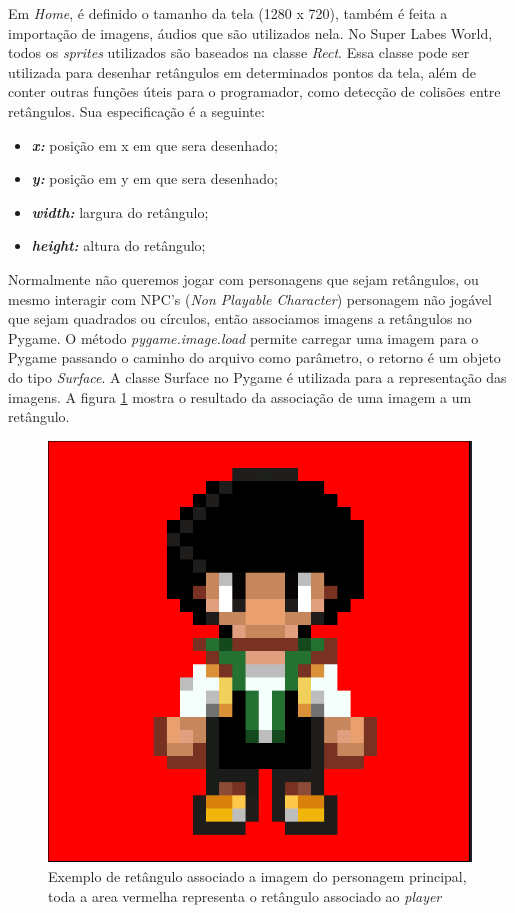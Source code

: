 Em \textit{Home}, é definido o tamanho da tela (1280 x 720), também é feita a importação de imagens, áudios que são utilizados nela.
No Super Labes World, todos os \textit{sprites} utilizados são baseados na classe \textit{Rect}. Essa classe pode ser utilizada para desenhar retângulos em determinados pontos da tela, além de conter outras funções úteis para o programador, como detecção de colisões entre retângulos. Sua especificação é a seguinte:
\begin{itemize}
    \item \textit{\textbf{x:}} posição em x em que sera desenhado;
    \item \textit{\textbf{y:}} posição em y em que sera desenhado;
    \item \textit{\textbf{width:}} largura do retângulo;
    \item \textit{\textbf{height:}} altura do retângulo;
\end{itemize}


Normalmente não queremos jogar com personagens que sejam retângulos, ou mesmo interagir com NPC's (\textit{Non Playable Character}) personagem não jogável que sejam quadrados ou círculos, então associamos imagens a retângulos no Pygame. O método \textit{pygame.image.load} permite carregar uma imagem para o Pygame passando o caminho do arquivo como parâmetro, o retorno é um objeto do tipo \textit{Surface}. A classe Surface no Pygame é utilizada  para a representação das imagens. A figura \ref{fig:player} mostra o resultado da associação de uma imagem a um retângulo.
\begin{figure}[h!]
    \centering
    \includegraphics[width=0.5\linewidth]{figuras/player.png}
    \caption{Exemplo de retângulo associado a imagem do personagem principal, toda a area vermelha representa o retângulo associado ao \textit{player}}
    \label{fig:player}
\end{figure}

